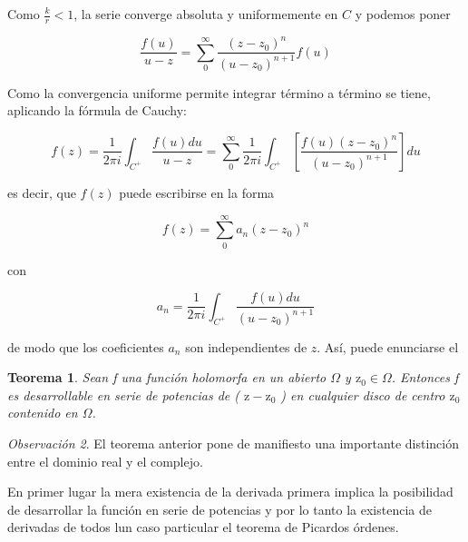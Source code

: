 \documentclass[10pt]{article}
\theoremstyle{plain}
\newtheorem{theorem}{Teorema}[section]
\theoremstyle{definition}
\theoremstyle{remark}
\newtheorem{remark}[theorem]{Observación}
\begin{document}
Como $\frac{k}{r}<1$, la serie converge absoluta y uniformemente en $C$ y podemos poner

$$
\frac{f(u)}{u-z}=\sum_{0}^{\infty} \frac{\left(z-z_{0}\right)^{n}}{\left(u-z_{0}\right)^{n+1}} f(u)
$$

Como la convergencia uniforme permite integrar término a término se tiene, aplicando la fórmula de Cauchy:

$$
f(z)=\frac{1}{2 \pi i} \int_{C^{+}} \frac{f(u) d u}{u-z}=\sum_{0}^{\infty} \frac{1}{2 \pi i} \int_{C^{+}}\left[\frac{f(u)\left(z-z_{0}\right)^{n}}{\left(u-z_{0}\right)^{n+1}}\right] d u
$$

es decir, que $f(z)$ puede escribirse en la forma

$$
f(z)=\sum_{0}^{\infty} a_{n}\left(z-z_{0}\right)^{n}
$$

con


\begin{equation*}
a_{n}=\frac{1}{2 \pi i} \int_{C^{+}} \frac{f(u) d u}{\left(u-z_{0}\right)^{n+1}} \tag{11-1}
\end{equation*}


de modo que los coeficientes $a_{n}$ son independientes de $z$. Así, puede enunciarse el

\begin{theorem}
Sean f una función holomorfa en un abierto $\Omega$ y $\mathrm{z}_{0} \in \Omega$. Entonces f es desarrollable en serie de potencias de ( $\mathrm{z}-\mathrm{z}_{0}$ ) en cualquier disco de centro $\mathrm{z}_{0}$ contenido en $\Omega$.
\end{theorem}

\begin{remark}
El teorema anterior pone de manifiesto una importante distinción entre el dominio real y el complejo.

En primer lugar la mera existencia de la derivada primera implica la posibilidad de desarrollar la función en serie de potencias y por lo tanto la existencia de derivadas de todos lun caso particular el teorema de Picardos órdenes.
\end{remark}
\end{document}
